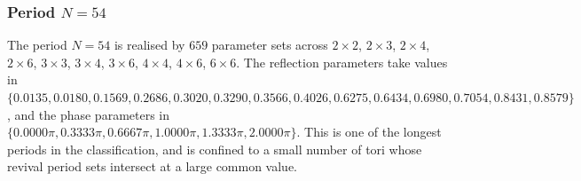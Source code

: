 \par
\subsubsection{Period $N = 54$}
The period $N=54$ is realised by $659$ parameter sets across $2\times2$, $2\times3$, $2\times4$, $2\times6$, $3\times3$, $3\times4$, $3\times6$, $4\times4$, $4\times6$, $6\times6$. The reflection parameters take values in $\{0.0135, 0.0180, 0.1569, 0.2686, 0.3020, 0.3290, 0.3566, 0.4026, 0.6275, 0.6434, 0.6980, 0.7054, 0.8431, 0.8579\}$, and the phase parameters in $\{0.0000\pi, 0.3333\pi, 0.6667\pi, 1.0000\pi, 1.3333\pi, 2.0000\pi\}$. This is one of the longest periods in the classification,
and is confined to a small number of tori whose revival
period sets intersect at a large common value.
